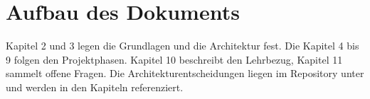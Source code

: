 \section{Aufbau des Dokuments}

Kapitel 2 und 3 legen die Grundlagen und die Architektur fest. Die Kapitel 4 bis 9 folgen den Projektphasen. Kapitel 10 beschreibt den Lehrbezug, Kapitel 11 sammelt offene Fragen. Die Architekturentscheidungen liegen im Repository unter  und werden in den Kapiteln referenziert.
